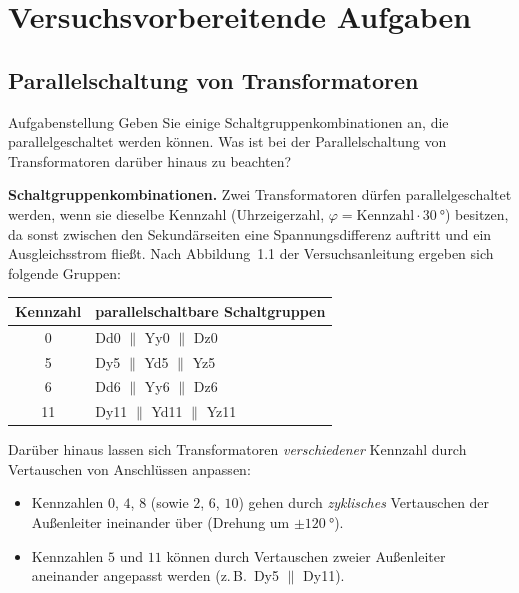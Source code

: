 \documentclass[a4paper,11pt]{scrreprt}
\begin{document}
\chapter{Versuchsvorbereitende Aufgaben}
\section{Parallelschaltung von Transformatoren}\label{sec:a1}

\begin{aufgabe}{Aufgabenstellung}
Geben Sie einige Schaltgruppenkombinationen an, die parallelgeschaltet werden können. Was ist bei der Parallelschaltung von Transformatoren darüber hinaus zu beachten?
\end{aufgabe}

\textbf{Schaltgruppenkombinationen.} Zwei Transformatoren dürfen parallelgeschaltet werden, wenn sie dieselbe Kennzahl (Uhrzeigerzahl, $\varphi = \text{Kennzahl}\cdot\SI{30}{\degree}$) besitzen, da sonst zwischen den Sekundärseiten eine Spannungsdifferenz auftritt und ein Ausgleichsstrom fließt. Nach Abbildung~1.1 der Versuchsanleitung ergeben sich folgende Gruppen:

\begin{center}
\begin{tabular}{@{}cl@{}}
\toprule
Kennzahl & parallelschaltbare Schaltgruppen\\
\midrule
0  & Dd0 $\parallel$ Yy0 $\parallel$ Dz0\\
5  & Dy5 $\parallel$ Yd5 $\parallel$ Yz5\\
6  & Dd6 $\parallel$ Yy6 $\parallel$ Dz6\\
11 & Dy11 $\parallel$ Yd11 $\parallel$ Yz11\\
\bottomrule
\end{tabular}
\end{center}

Darüber hinaus lassen sich Transformatoren \emph{verschiedener} Kennzahl durch Vertauschen von Anschlüssen anpassen:
\begin{itemize}[nosep]
  \item Kennzahlen $0$, $4$, $8$ (sowie $2$, $6$, $10$) gehen durch \emph{zyklisches} Vertauschen der Außenleiter ineinander über (Drehung um $\pm\SI{120}{\degree}$).
  \item Kennzahlen $5$ und $11$ können durch Vertauschen zweier Außenleiter aneinander angepasst werden (z.\,B.\ Dy5 $\parallel$ Dy11).
\end{itemize}
\end{document}
